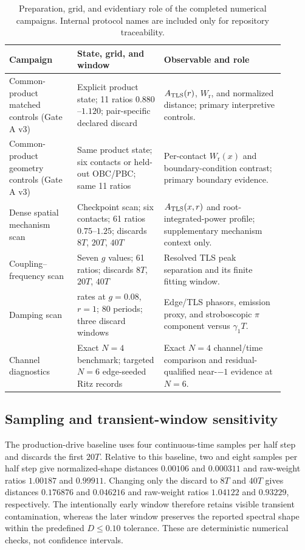 \documentclass[11pt]{article}
\newcommand{\Wraw}{W_{\mathrm r}}
\begin{document}
\begin{table}[ht]
\centering
\caption{Preparation, grid, and evidentiary role of the completed numerical campaigns. Internal protocol names are included only for repository traceability.}
\label{tab:supp-campaigns}
\small
\begin{tabular}{>{\raggedright\arraybackslash}p{0.22\linewidth}>{\raggedright\arraybackslash}p{0.29\linewidth}>{\raggedright\arraybackslash}p{0.39\linewidth}}
\toprule
Campaign & State, grid, and window & Observable and role \\
\midrule
Common-product matched controls (Gate A v3) & Explicit product state; 11 ratios $0.880$--$1.120$; pair-specific declared discard & $A_{\rm TLS}(r)$, $\Wraw$, and normalized distance; primary interpretive controls. \\
Common-product geometry controls (Gate A v3) & Same product state; six contacts or held-out OBC/PBC; same 11 ratios & Per-contact $\Wraw(x)$ and boundary-condition contrast; primary boundary evidence. \\
Dense spatial mechanism scan & Checkpoint scan; six contacts; 61 ratios $0.75$--$1.25$; discards $8T$, $20T$, $40T$ & $A_{\rm TLS}(x,r)$ and root-integrated-power profile; supplementary mechanism context only. \\
Coupling--frequency scan & Seven $g$ values; 61 ratios; discards $8T$, $20T$, $40T$ & Resolved TLS peak separation and its finite fitting window. \\
Damping scan & 31 rates at $g=0.08$, $r=1$; 80 periods; three discard windows & Edge/TLS phasors, emission proxy, and stroboscopic $\pi$ component versus $\gamma_1T$. \\
Channel diagnostics & Exact $N=4$ benchmark; targeted $N=6$ edge-seeded Ritz records & Exact $N=4$ channel/time comparison and residual-qualified near-$-1$ evidence at $N=6$. \\
\bottomrule
\end{tabular}
\end{table}

\subsection{Sampling and transient-window sensitivity}

The production-drive baseline uses four continuous-time samples per half step and discards the first $20T$. Relative to this baseline, two and eight samples per half step give normalized-shape distances $0.00106$ and $0.000311$ and raw-weight ratios $1.00187$ and $0.99911$. Changing only the discard to $8T$ and $40T$ gives distances $0.176876$ and $0.046216$ and raw-weight ratios $1.04122$ and $0.93229$, respectively. The intentionally early window therefore retains visible transient contamination, whereas the later window preserves the reported spectral shape within the predefined $D\le0.10$ tolerance. These are deterministic numerical checks, not confidence intervals.
\end{document}
